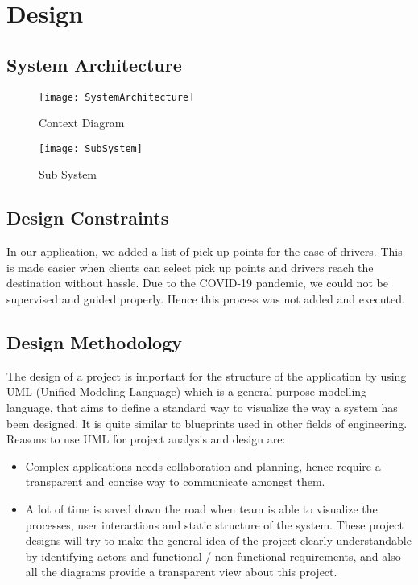 \chapter{Design} \label{chap:design}

\section{System Architecture}
  
\begin{figure}[ht]
\center
\texttt{[image: SystemArchitecture]}
\caption{Context Diagram}
\label{fig:Context Diagram}
\end{figure}
\begin{figure}[ht]
\center
\texttt{[image: SubSystem]}
\caption{Sub System}
\label{fig:SubSystem}
\end{figure}

\section{Design Constraints} 
In our application, we added a list of pick up points for the ease of drivers. This is made easier when clients can select pick up points and drivers reach the destination without hassle. Due to the COVID-19 pandemic, we could not be supervised and guided properly. Hence this process was not added and executed.

\section{Design Methodology}
The design of a project is important for the structure of the application by using UML (Unified Modeling Language) which is a general purpose modelling language, that aims to define a standard way to visualize the way a system has been designed. It is quite similar to blueprints used in other fields of engineering. Reasons to use UML for project analysis and design are: 

\begin{itemize}
\item Complex applications needs collaboration and planning, hence require a transparent and concise way to communicate amongst them.
\item A lot of time is saved down the road when team is able to visualize the processes, user interactions and static structure of the system. These project designs will try to make the general idea of the project clearly understandable by identifying actors and functional / non-functional requirements, and also all the diagrams provide a transparent view about this project.
\end{itemize}

